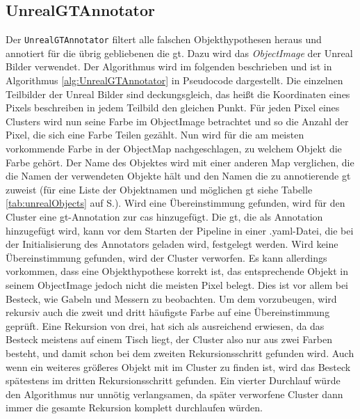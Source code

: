 \subsection{UnrealGTAnnotator}
Der \texttt{UnrealGTAnnotator} filtert alle falschen Objekthypothesen heraus und annotiert für die übrig gebliebenen die \gls{gt}. Dazu wird das \textit{ObjectImage} der Unreal Bilder verwendet. Der Algorithmus wird im folgenden beschrieben und ist in Algorithmus \ref{alg:UnrealGTAnnotator} in Pseudocode dargestellt. Die einzelnen Teilbilder der Unreal Bilder sind deckungsgleich, das heißt die Koordinaten eines Pixels beschreiben in jedem Teilbild den gleichen Punkt. Für jeden Pixel eines Clusters wird nun seine Farbe im ObjectImage betrachtet und so die Anzahl der Pixel, die sich eine Farbe Teilen gezählt. Nun wird für die am meisten vorkommende Farbe in der ObjectMap nachgeschlagen, zu welchem Objekt die Farbe gehört. Der Name des Objektes wird mit einer anderen Map verglichen, die die Namen der verwendeten Objekte hält und den Namen die zu annotierende \gls{gt} zuweist (für eine Liste der Objektnamen und möglichen \gls{gt} siehe Tabelle \ref{tab:unrealObjects} auf S.\pageref{tab:unrealObjects}). Wird eine Übereinstimmung gefunden, wird für den Cluster eine \gls{gt}-Annotation zur \gls{cas} hinzugefügt. Die \gls{gt}, die als Annotation hinzugefügt wird, kann vor dem Starten der Pipeline in einer .yaml-Datei, die bei der Initialisierung des Annotators geladen wird, festgelegt werden. Wird keine Übereinstimmung gefunden, wird der Cluster verworfen. Es kann allerdings vorkommen, dass eine Objekthypothese korrekt ist, das entsprechende Objekt in seinem ObjectImage jedoch nicht die meisten Pixel belegt. Dies ist vor allem bei Besteck, wie Gabeln und Messern zu beobachten. Um dem vorzubeugen, wird rekursiv auch die zweit und dritt häufigste Farbe auf eine Übereinstimmung geprüft. Eine Rekursion von drei, hat sich als ausreichend erwiesen, da das Besteck meistens auf einem Tisch liegt, der Cluster also nur aus zwei Farben besteht, und damit schon bei dem zweiten Rekursionsschritt gefunden wird. Auch wenn ein weiteres größeres Objekt mit im Cluster zu finden ist, wird das Besteck spätestens im dritten Rekursionsschritt gefunden. Ein vierter Durchlauf würde den Algorithmus nur unnötig verlangsamen, da später verworfene Cluster dann immer die gesamte Rekursion komplett durchlaufen würden. 

